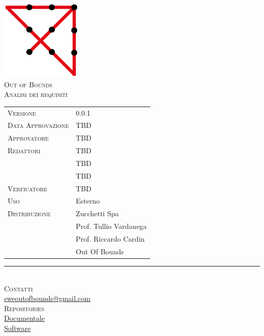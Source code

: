 \documentclass[12pt]{article}
\makeatletter
\def \currentVersion {0.0.1} %
\def \approvalDate {TBD}
\def \approver {TBD}
\def \firstEditor {TBD}
\def \secondEditor {TBD}
\def \thirdEditor {TBD}
\def \teemMail {sweoutofbounds@gmail.com}
\def \documentsRepo {https://github.com/SWE-OutOfBounds/Documents}
\def \softwareRepo {}
\makeatother
\begin{document}

\thispagestyle{empty}
\setcounter{page}{0}

\begin{center}
\includegraphics[width=1.5in,height=1.5in]{OutOfBoundsLogo.png}\\
\Large
\textsc{Out of Bounds}\\
\vspace{1.5cm}
\Huge
\textsc{Analisi dei requisiti}\\
\vspace{2cm}

\Large
\begin{tabular}{R{8cm}|p{8cm}}
\hline
\textsc{Versione}           & \currentVersion\\
\textsc{Data Approvazione}  & \approvalDate\\
\textsc{Approvatore}        & \approver\\
\textsc{Redattori}          & \firstEditor\\
\hfill                      & \secondEditor\\
\hfill                      & \thirdEditor\\
\textsc{Verficatore}        & \firstEditor\\
\textsc{Uso}                & Esterno\\
\textsc{Distribuzione}      & Zucchetti Spa\\
\hfill                      & Prof. Tullio Vardanega\\
\hfill                      & Prof. Riccardo Cardin\\
\hfill                      & Out Of Bounds\\

\end{tabular}

\vfill

\normalsize
\rule{8cm}{0.1mm}\\
\bigskip
\textsc{Contatti}\\
\href{mailto:\teemMail}{\teemMail}\\
\textsc{Repositories}\\
\href{\documentsRepo}{Documentale}\\
\href{\softwareRepo}{Software} 
\end{center}
\end{document}
